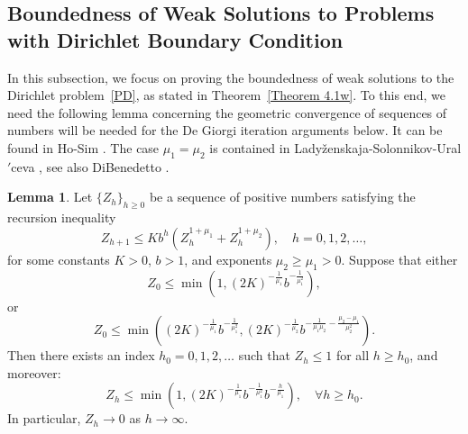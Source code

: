 \documentclass[10pt,reqno]{amsart}
\newcommand *\w{^\wedge}
\newcommand{\cprime}{\('\)}
\theoremstyle{definition}
\newtheorem{lemma}[theorem]{Lemma}
\numberwithin{equation}{section}
\begin{document}
\subsection{Boundedness of Weak Solutions to Problems with Dirichlet Boundary Condition}

In this subsection, we focus on proving the boundedness of weak solutions to the Dirichlet problem~\eqref{PD}, as stated in Theorem~\ref{Theorem 4.1w}. To this end, we need the following lemma concerning the geometric convergence of sequences of numbers will be needed for the De Giorgi iteration arguments below. It can be found in Ho-Sim \cite[Lemma 4.3]{Ho-Sim-2015}. The case $\mu_1=\mu_2$ is contained in Lady{\v{z}}enskaja-Solonnikov-Ural{\cprime}ceva \cite[Chapter II, Lemma 5.6]{OL}, see also DiBenedetto \cite[Chapter I, Lemma 4.1]{EDI}.
\begin{lemma}\label{leRecur}
	Let $\{Z_h\}_{h\geq 0}$ be a sequence of positive numbers satisfying the recursion inequality
\[
Z_{h+1} \leq K b^h \left(Z_h^{1+\mu_1} + Z_h^{1+\mu_2}\right), \quad h = 0,1,2,\dots,
\]
for some constants $K > 0$, $b > 1$, and exponents $\mu_2 \geq \mu_1 > 0$. Suppose that either
\[
Z_0 \leq \min \left(1, (2K)^{-\frac{1}{\mu_1}} b^{-\frac{1}{\mu_1^2}} \right),
\]
or
\[
Z_0 \leq \min \left( (2K)^{-\frac{1}{\mu_1}} b^{-\frac{1}{\mu_1^2}}, (2K)^{-\frac{1}{\mu_2}} b^{-\frac{1}{\mu_1 \mu_2} - \frac{\mu_2 - \mu_1}{\mu_2^2}} \right).
\]
Then there exists an index $h_0=0,1,2,\ldots$ such that $Z_h \leq 1$ for all $h \geq h_0$, and moreover:
\[
Z_h \leq \min \left(1, (2K)^{-\frac{1}{\mu_1}} b^{-\frac{1}{\mu_1^2}} b^{-\frac{h}{\mu_1}} \right), \quad \forall h \geq h_0.
\]
In particular, $Z_h \to 0$ as $h \to \infty$.
\end{lemma}
\end{document}
